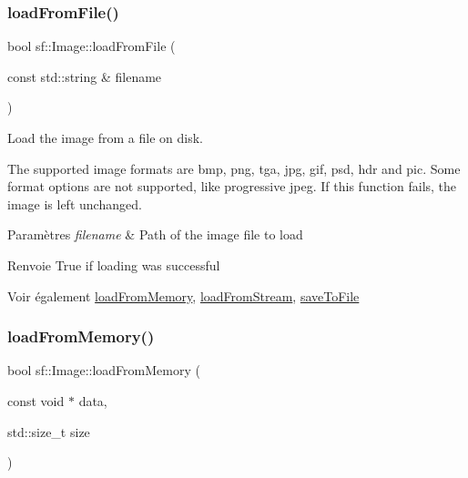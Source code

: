 \subsubsection{\texorpdfstring{load\+From\+File()}{loadFromFile()}}
{\footnotesize\ttfamily bool sf\+::\+Image\+::load\+From\+File (\begin{DoxyParamCaption}\item[{const std\+::string \&}]{filename }\end{DoxyParamCaption})}



Load the image from a file on disk. 

The supported image formats are bmp, png, tga, jpg, gif, psd, hdr and pic. Some format options are not supported, like progressive jpeg. If this function fails, the image is left unchanged.


\begin{DoxyParams}{Paramètres}
{\em filename} & Path of the image file to load\\
\hline
\end{DoxyParams}
\begin{DoxyReturn}{Renvoie}
True if loading was successful
\end{DoxyReturn}
\begin{DoxySeeAlso}{Voir également}
\hyperlink{classsf_1_1Image_aaa6c7afa5851a51cec6ab438faa7354c}{load\+From\+Memory}, \hyperlink{classsf_1_1Image_a21122ded0e8368bb06ed3b9acfbfb501}{load\+From\+Stream}, \hyperlink{classsf_1_1Image_a51537fb667f47cbe80395cfd7f9e72a4}{save\+To\+File} 
\end{DoxySeeAlso}
\mbox{\label{classsf_1_1Image_aaa6c7afa5851a51cec6ab438faa7354c}} 
\subsubsection{\texorpdfstring{load\+From\+Memory()}{loadFromMemory()}}
{\footnotesize\ttfamily bool sf\+::\+Image\+::load\+From\+Memory (\begin{DoxyParamCaption}\item[{const void $\ast$}]{data,  }\item[{std\+::size\+\_\+t}]{size }\end{DoxyParamCaption})}



